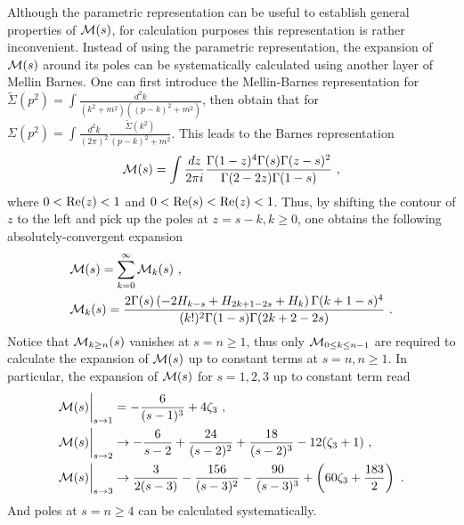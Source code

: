 \documentclass[a4paper,11pt]{article}
\begin{document}
Although the parametric representation can be useful to establish general properties of ${\cal M}(s)$, for calculation purposes this representation is rather inconvenient. Instead of using the parametric representation, the expansion of ${\cal M}(s)$ around its poles can be systematically calculated using another layer of Mellin Barnes. One can first introduce the Mellin-Barnes representation for $\tilde \Sigma(p^2)=\int \frac{d^2k}{(k^2+m^2)((p-k)^2+m^2)}$, then obtain that for $\Sigma(p^2)=\int \frac{d^2k}{(2\pi)^2}\frac{\tilde \Sigma(k^2)}{(p-k)^2+m^2}$. This leads to the Barnes representation
\begin{align}
{\cal M}(s)=\int \frac{dz}{2\pi i}\frac{\Gamma (1-z)^4 \Gamma (s) \Gamma (z-s)^2}{\Gamma (2-2 z) \Gamma (1-s)} \ ,
\end{align}
where $0<{\rm Re}(z)<1$ and $0<{\rm Re}(s)<{\rm Re}(z)<1$. Thus, by shifting the contour of $z$ to the left and pick up the poles at $z=s-k, k\ge 0$, one obtains the following absolutely-convergent expansion
\begin{align}
&{\cal M}(s)=\sum_{k=0}^{\infty}{\cal M}_k(s) \ , \\
&{\cal M}_k(s)=\frac{2 \Gamma (s) \left(-2 H_{k-s}+H_{2 k+1-2 s}+H_k\right) \Gamma (k+1-s)^4}{(k!)^2 \Gamma (1-s) \Gamma (2 k+2-2s)} \ .
\end{align}
Notice that ${\cal M}_{k \ge n}(s)$ vanishes at $s=n\ge 1$, thus only ${\cal M}_{0 \le k \le n-1}$ are required to calculate the expansion of ${\cal M}(s)$ up to constant terms at $s=n, n\ge 1$. In particular, the expansion of ${\cal M}(s)$ for $s=1,2,3$ up to constant term read
\begin{align}
&{\cal M}(s)\bigg|_{s\rightarrow 1} = -\frac{6}{(s-1)^3}+4\zeta_3 \ , \\
&{\cal M}(s)\bigg|_{s\rightarrow 2} \rightarrow -\frac{6}{s-2}+\frac{24}{(s-2)^2}+\frac{18}{(s-2)^3}-12 (\zeta_3+1) \ , \\ 
&{\cal M}(s)\bigg|_{s\rightarrow 3} \rightarrow\frac{3}{2 (s-3)}-\frac{156}{(s-3)^2}-\frac{90}{(s-3)^3}+\left(60 \zeta_3+\frac{183}{2}\right) \ .
\end{align}
And poles at $s=n\ge4$ can be calculated systematically.
\end{document}
